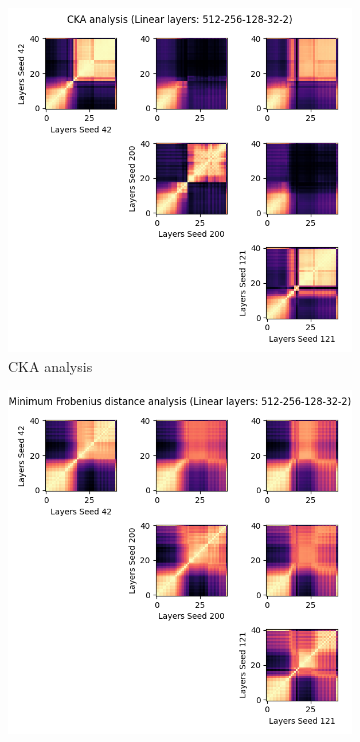 \documentclass[../main.tex]{subfiles}
\begin{document}
\begin{figure}[ht!]
     \centering
    \begin{subfigure}[b]{0.45\textwidth}
         \centering
        \includegraphics[width=\textwidth]{figures/rs/sim_ae/cka_512-256-128-32-2__42_200_121.png} 
        \caption{CKA analysis}
        \label{fig:cka_ae_512_256_128_32_2}
     \end{subfigure}\hfill
      \begin{subfigure}[b]{0.45\textwidth}
         \centering
         \includegraphics[width=\textwidth]{figures/rs/sim_ae/frob_512-256-128-32-2__42_200_121.png}

\end{subfigure}
\end{figure}
\end{document}
